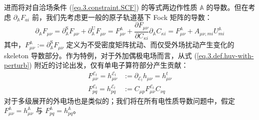 进而将对自洽场条件 (\ref{eq.3.constraint.SCF}) 的等式两边作性质 $\mathbb{A}$ 的导数。但在考虑 $\partial_{\mathbb{A}} F_{ai}$ 前，我们先考虑更一般的原子轨道基下 Fock 矩阵的导数：
\begin{equation}
  \label{eq.3.deduct.pd-Fuv}
  \partial_{\mathbb{A}} F_{\mu \nu} = \partial_{\mathbb{A}}^\mathrm{S} F_{\mu \nu} + \partial_{\mathbb{A}}^\mathrm{U} F_{\mu \nu}
  = F_{\mu \nu}^{\mathbb{A}} + \frac{\partial F_{\mu \nu}}{\partial C_{\kappa i}} \partial_{\mathbb{A}} C_{\kappa i}= F_{\mu \nu}^{\mathbb{A}} + A_{\mu \nu, mi} U_{mi}^{\mathbb{A}}
\end{equation}
其中，$F_{\mu \nu}^{\mathbb{A}} := \partial_{\mathbb{A}}^\mathrm{S} F_{\mu \nu}$ 定义为不受密度矩阵扰动、而仅受外场扰动产生变化的 skeleton 导数部分。作为特例，对于外加偶极电场而言，从式 (\ref{eq.3.def.huv-with-perturb}) 附近的讨论出发，仅有单电子算符部分产生贡献：
\begin{align}
  \label{eq.3.def.sleketon-huv}
  F_{\mu \nu}^{\mathcal{E}_t} = h_{\mu \nu}^{\mathcal{E}_t} &:= \partial_{\mathcal{E}_t} h_{\mu \nu} = h_{\mu \nu}^t \\
  F_{pq}^{\mathcal{E}_t} = h_{pq}^{\mathcal{E}_t} &:= C_{\mu p} F_{\mu \nu}^{\mathcal{E}_t} C_{\nu q}
\end{align}
对于多级展开的外电场也是类似的；我们将在所有电性质导数问题中，假定 $F_{\mu \nu}^{\mathbb{A}} = h_{\mu \nu}^{\mathbb{A}}$ 与 $F_{pq}^{\mathbb{A}} = h_{pq}^{\mathbb{A}}$。

